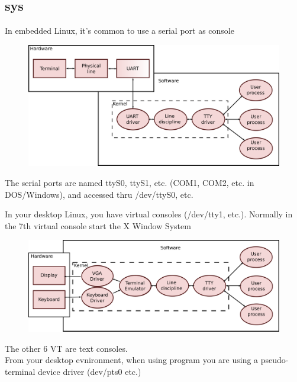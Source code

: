 \documentclass[xcolor=dvipsnames,compress]{beamer}
\begin{document}
\subsection*{sys}
\begin{frame}
    In embedded Linux, it's common to use a serial port as console
    \begin{figure}[h]
    \centering
    \includegraphics[width=\textwidth]{comm}
    \end{figure}
    The serial ports are named ttyS0, ttyS1, etc. (COM1, COM2, etc. in DOS/Windows), 
    and accessed thru /dev/ttyS0, etc.
\end{frame}
\begin{frame}
    In your desktop Linux, you have virtual consoles (/dev/tty1, etc.). 
    Normally in the 7th virtual console start the X Window System
    \begin{figure}[h]
    \centering
    \includegraphics[width=\textwidth]{comm2}
    \end{figure}
    The other 6 VT are text consoles.\\
    From your desktop evnironment, when using  
    program you are using a pseudo-terminal device driver (dev/pts0 etc.)
\end{frame}
\end{document}
